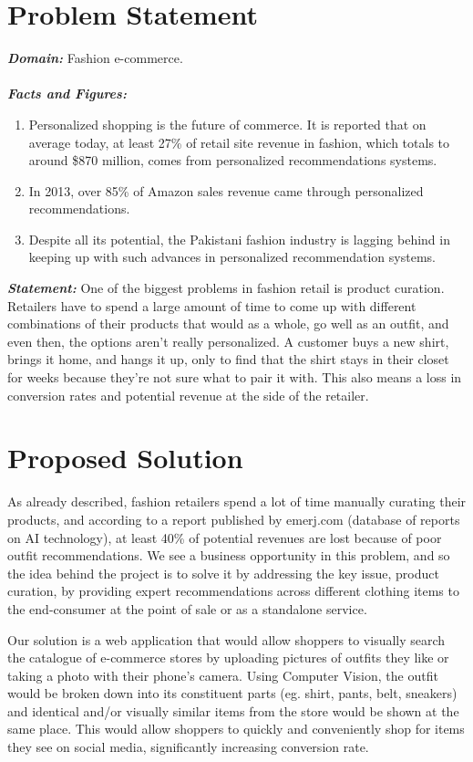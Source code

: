 \section{Problem Statement}
\textbf{\emph{Domain:}} Fashion e-commerce. \\\\
\textbf{\emph{Facts and Figures:}} 
\begin{enumerate}
	\item Personalized shopping is the future of commerce. It is reported that on average today, at least 27\% of retail site revenue in fashion, which totals to around \$870 million, comes from personalized recommendations systems. \cite{salesforce}
	\item In 2013, over 85\% of Amazon sales revenue came through personalized recommendations. \cite{mckinsey}
	\item Despite all its potential, the Pakistani fashion industry is lagging behind in keeping up with such advances in personalized recommendation systems. \cite{thenewspk}
\end{enumerate}
\textbf{\emph{Statement:}} One of the biggest problems in fashion retail is product curation. Retailers have to spend a large amount of time to come up with different combinations of their products that would as a whole, go well as an outfit, and even then, the options aren’t really personalized. A customer buys a new shirt, brings it home, and hangs it up, only to find that the shirt stays in their closet for weeks because they’re not sure what to pair it with. This also means a loss in conversion rates and potential revenue at the side of the retailer.

\section{Proposed Solution}

As already described, fashion retailers spend a lot of time manually curating their products, and according to a report published by emerj.com (database of reports on AI technology), at least 40\% of potential revenues are lost because of poor outfit recommendations. We see a business opportunity in this problem, and so the idea behind the project is to solve it by addressing the key issue, product curation, by providing expert recommendations across different clothing items to the end-consumer at the point of sale or as a standalone service.


Our solution is a web application that would allow shoppers to visually search the catalogue of e-commerce stores by uploading pictures of outfits they like or taking a photo with their phone’s camera. Using Computer Vision, the outfit would be broken down into its constituent parts (eg. shirt, pants, belt, sneakers) and identical and/or visually similar items from the store would be shown at the same place. This would allow shoppers to quickly and conveniently shop for items they see on social media, significantly increasing conversion rate.

